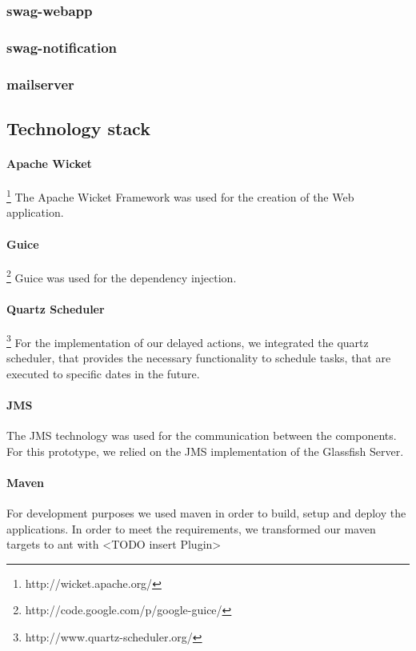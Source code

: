 \documentclass[a4paper]{article}
\begin{document}
\subsubsection{swag-webapp}

\subsubsection{swag-notification}

\subsubsection{mailserver}


\subsection{Technology stack}
\paragraph{Apache Wicket}\footnote{http://wicket.apache.org/}
The Apache Wicket Framework was used for the creation of the Web application.

\paragraph{Guice}\footnote{http://code.google.com/p/google-guice/}
Guice was used for the dependency injection.

\paragraph{Quartz Scheduler} \footnote{http://www.quartz-scheduler.org/}
For the implementation of our delayed actions, we integrated the quartz scheduler, that provides the necessary functionality to schedule tasks, that are executed to specific dates in the future.

\paragraph{JMS}
The JMS technology was used for the communication between the components. For this prototype, we relied on the JMS implementation of the Glassfish Server.

\paragraph{Maven}
For development purposes we used maven in order to build, setup and deploy the applications. In order to meet the requirements, we transformed our maven targets to ant with <TODO insert Plugin>
\end{document}
